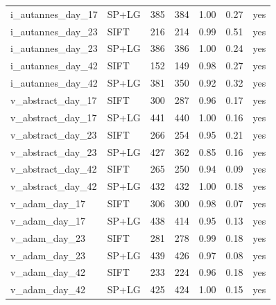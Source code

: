 \begin{longtable}{llrrrrr}
i\_autannes\_day\_17 & SP+LG & 385 & 384 & 1.00 & 0.27 & yes \\
i\_autannes\_day\_23 & SIFT & 216 & 214 & 0.99 & 0.51 & yes \\
i\_autannes\_day\_23 & SP+LG & 386 & 386 & 1.00 & 0.24 & yes \\
i\_autannes\_day\_42 & SIFT & 152 & 149 & 0.98 & 0.27 & yes \\
i\_autannes\_day\_42 & SP+LG & 381 & 350 & 0.92 & 0.32 & yes \\
v\_abstract\_day\_17 & SIFT & 300 & 287 & 0.96 & 0.17 & yes \\
v\_abstract\_day\_17 & SP+LG & 441 & 440 & 1.00 & 0.16 & yes \\
v\_abstract\_day\_23 & SIFT & 266 & 254 & 0.95 & 0.21 & yes \\
v\_abstract\_day\_23 & SP+LG & 427 & 362 & 0.85 & 0.16 & yes \\
v\_abstract\_day\_42 & SIFT & 265 & 250 & 0.94 & 0.09 & yes \\
v\_abstract\_day\_42 & SP+LG & 432 & 432 & 1.00 & 0.18 & yes \\
v\_adam\_day\_17 & SIFT & 306 & 300 & 0.98 & 0.07 & yes \\
v\_adam\_day\_17 & SP+LG & 438 & 414 & 0.95 & 0.13 & yes \\
v\_adam\_day\_23 & SIFT & 281 & 278 & 0.99 & 0.18 & yes \\
v\_adam\_day\_23 & SP+LG & 439 & 426 & 0.97 & 0.08 & yes \\
v\_adam\_day\_42 & SIFT & 233 & 224 & 0.96 & 0.18 & yes \\
v\_adam\_day\_42 & SP+LG & 425 & 424 & 1.00 & 0.15 & yes \\
\end{longtable}\endgroup
